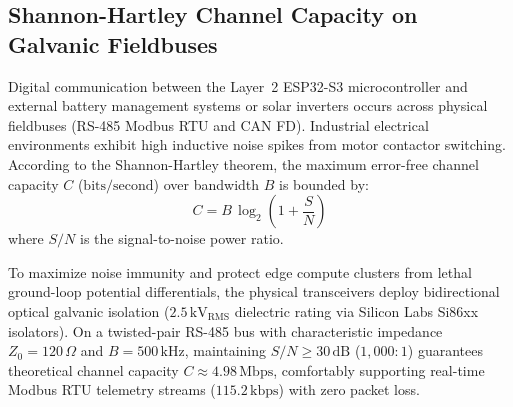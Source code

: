 \subsection{Shannon-Hartley Channel Capacity on Galvanic Fieldbuses}
Digital communication between the Layer~2 ESP32-S3 microcontroller and external battery management systems or solar inverters occurs across physical fieldbuses (RS-485 Modbus RTU and CAN FD). Industrial electrical environments exhibit high inductive noise spikes from motor contactor switching. According to the Shannon-Hartley theorem, the maximum error-free channel capacity $C$ ($\mathrm{bits/second}$) over bandwidth $B$ is bounded by:
\begin{equation}
C = B \, \log_2 \left( 1 + \frac{S}{N} \right)
\label{eq:shannon_hartley}
\end{equation}
where $S/N$ is the signal-to-noise power ratio.

To maximize noise immunity and protect edge compute clusters from lethal ground-loop potential differentials, the physical transceivers deploy bidirectional optical galvanic isolation ($2.5\,\mathrm{kV}_{\mathrm{RMS}}$ dielectric rating via Silicon Labs Si86xx isolators). On a twisted-pair RS-485 bus with characteristic impedance $Z_0 = 120\,\Omega$ and $B = 500\,\mathrm{kHz}$, maintaining $S/N \ge 30\,\mathrm{dB}$ ($1{,}000:1$) guarantees theoretical channel capacity $C \approx 4.98\,\mathrm{Mbps}$, comfortably supporting real-time Modbus RTU telemetry streams ($115.2\,\mathrm{kbps}$) with zero packet loss.

